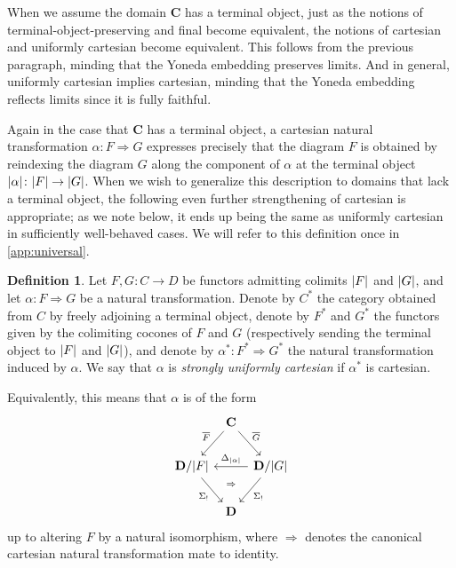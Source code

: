 \documentclass[11pt, oneside, article]{memoir}
\theoremstyle{plain}
\theoremstyle{definition}
\newtheorem{definition}[def]{Definition}
\theoremstyle{remark}
\DeclarePairedDelimiter{\abs}{\lvert}{\rvert}
\newcommand{\bang}{\mathrm{!}}
\newcommand{\cat}[1]{\mathbf{#1}}
\newcommand{\pts}[1]{{\abs{#1}}}
\newcommand{\ptlift}[1]{\overline{#1}}
\newcommand{\slicel}{\Sigma_\bang}
\newcommand{\bC}{\cat{C}}
\newcommand{\bD}{\cat{D}}
\begin{document}
When we assume the domain $\bC$ has a terminal object, just as the
notions of terminal-object-preserving and final become equivalent, the
notions of cartesian and uniformly cartesian become equivalent. This
follows from the previous paragraph, minding that the Yoneda embedding
preserves limits. And in general, uniformly cartesian implies
cartesian, minding that the Yoneda embedding reflects limits since it
is fully faithful.

Again in the case that $\bC$ has a terminal object, a cartesian
natural transformation $\alpha \colon F \Rightarrow G$ expresses
precisely that the diagram $F$ is obtained by reindexing the diagram
$G$ along the component of $\alpha$ at the terminal object
$\pts{\alpha} \colon \pts{F} \to \pts{G}$.
When we wish to generalize this description to domains that lack a
terminal object, the following even further strengthening of cartesian
is appropriate; as we note below, it ends up being the same as
uniformly cartesian in sufficiently well-behaved cases. We will refer
to this definition once in \cref{app:universal}.

\begin{definition}\label{def:strongcartesian}
  Let $F, G \colon C \to D$ be functors admitting colimits $\pts{F}$
  and $\pts{G}$, and let $\alpha \colon F \Rightarrow G$ be a natural
  transformation. Denote by $C^*$ the category obtained from $C$ by
  freely adjoining a terminal object, denote by $F^*$ and $G^*$ the
  functors given by the colimiting cocones of $F$ and $G$
  (respectively sending the terminal object to $\pts{F}$ and
  $\pts{G}$), and denote by $\alpha^* \colon F^* \Rightarrow G^*$ the
  natural transformation induced by $\alpha$. We say that $\alpha$ is
  \emph{strongly uniformly cartesian} if $\alpha^*$ is cartesian.

  Equivalently, this means that $\alpha$ is of the form
  \[\begin{tikzcd}[row sep=20,column sep=5pt]
      & \bC & \\
      {\bD/\pts{F}} && {\bD/\pts{G}} \\
      & \bD
      \arrow["{\ptlift{F}}"', from=1-2, to=2-1]
      \arrow["{\ptlift{G}}", from=1-2, to=2-3]
      \arrow["\slicel"', from=2-1, to=3-2]
      \arrow[""{name=0, anchor=center, inner sep=0}, "{\Delta_{\pts{\alpha}}}"', from=2-3, to=2-1]
      \arrow["\slicel", from=2-3, to=3-2]
      \arrow["\Rightarrow"{description}, draw=none, from=0, to=3-2]
    \end{tikzcd}\]
  up to altering $F$ by a natural isomorphism, where $\Rightarrow$
  denotes the canonical cartesian natural transformation mate to
  identity.
\end{definition}
\end{document}
